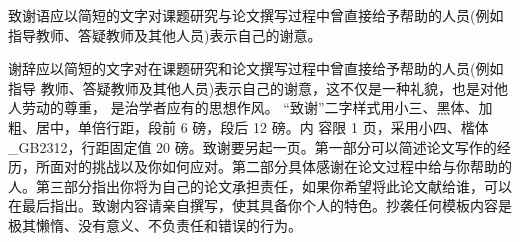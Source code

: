 \newpage
{}

致谢语应以简短的文字对课题研究与论文撰写过程中曾直接给予帮助的人员(例如指导教师、答疑教师及其他人员)表示自己的谢意。
	
谢辞应以简短的文字对在课题研究和论文撰写过程中曾直接给予帮助的人员(例如指导 教师、答疑教师及其他人员)表示自己的谢意，这不仅是一种礼貌，也是对他人劳动的尊重， 是治学者应有的思想作风。
“致谢”二字样式用小三、黑体、加粗、居中，单倍行距，段前 6 磅，段后 12 磅。内 容限 1 页，采用小四、楷体\_GB2312，行距固定值 20 磅。致谢要另起一页。第一部分可以简述论文写作的经历，所面对的挑战以及你如何应对。第二部分具体感谢在论文过程中给与你帮助的人。第三部分指出你将为自己的论文承担责任，如果你希望将此论文献给谁，可以在最后指出。致谢内容请亲自撰写，使其具备你个人的特色。抄袭任何模板内容是极其懒惰、没有意义、不负责任和错误的行为。
	
